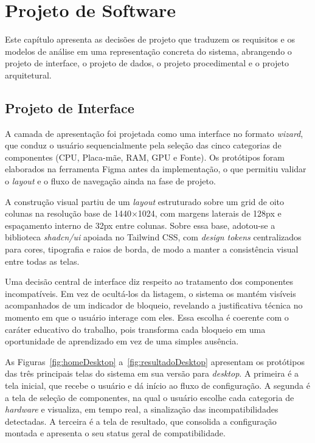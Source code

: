 \chapter{Projeto de Software}
\label{cap:06}

Este capítulo apresenta as decisões de projeto que traduzem os requisitos e os modelos de análise em uma representação concreta do sistema, abrangendo o projeto de interface, o projeto de dados, o projeto procedimental e o projeto arquitetural.

\section{Projeto de Interface}
\label{sec:projetoInterface}
A camada de apresentação foi projetada como uma interface no formato \textit{wizard}, que conduz o usuário sequencialmente pela seleção das cinco categorias de componentes (CPU, Placa-mãe, RAM, GPU e Fonte). Os protótipos foram elaborados na ferramenta Figma antes da implementação, o que permitiu validar o \textit{layout} e o fluxo de navegação ainda na fase de projeto.

A construção visual partiu de um \textit{layout} estruturado sobre um grid de oito colunas na resolução base de 1440$\times$1024, com margens laterais de 128px e espaçamento interno de 32px entre colunas. Sobre essa base, adotou-se a biblioteca \textit{shadcn/ui} apoiada no Tailwind CSS, com \textit{design tokens} centralizados para cores, tipografia e raios de borda, de modo a manter a consistência visual entre todas as telas. %

Uma decisão central de interface diz respeito ao tratamento dos componentes incompatíveis. Em vez de ocultá-los da listagem, o sistema os mantém visíveis acompanhados de um indicador de bloqueio, revelando a justificativa técnica no momento em que o usuário interage com eles. Essa escolha é coerente com o caráter educativo do trabalho, pois transforma cada bloqueio em uma oportunidade de aprendizado em vez de uma simples ausência.

As Figuras~\ref{fig:homeDesktop} a~\ref{fig:resultadoDesktop} apresentam os protótipos das três principais telas do sistema em sua versão para \textit{desktop}. A primeira é a tela inicial, que recebe o usuário e dá início ao fluxo de configuração. A segunda é a tela de seleção de componentes, na qual o usuário escolhe cada categoria de \textit{hardware} e visualiza, em tempo real, a sinalização das incompatibilidades detectadas. A terceira é a tela de resultado, que consolida a configuração montada e apresenta o seu status geral de compatibilidade.


